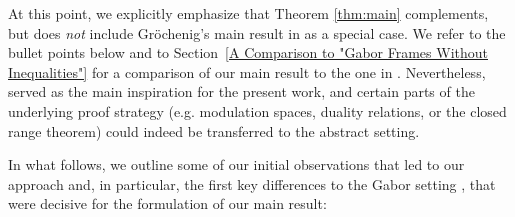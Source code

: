 \documentclass{amsart}
\begin{document}
At this point, we explicitly emphasize that Theorem \ref{thm:main} complements, but does \emph{not} include Gr\"ochenig's main result in \cite[Theorem~3.1]{gro07ineq} as a special case. We refer to the bullet points below and to Section~\ref{A Comparison to "Gabor Frames Without Inequalities"} for a comparison of our main result to the one in \cite{gro07ineq}. Nevertheless, \cite[Theorem~3.1]{gro07ineq} served as the main inspiration for the present work, and certain parts of the underlying proof strategy (e.g. modulation spaces, duality relations, or the closed range theorem) could indeed be transferred to the abstract setting.   

In what follows, we outline some of our  initial observations that led to our approach and, in particular, the first key differences to the Gabor setting \cite{gro07ineq}, that were decisive for the formulation of our main result:
\end{document}
